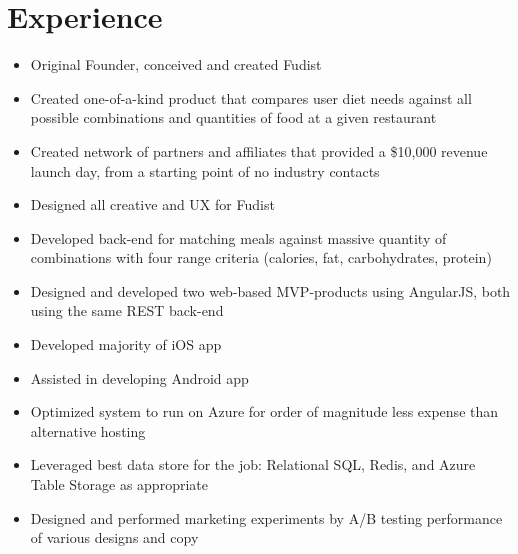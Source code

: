 \documentclass[12pt,letterpaper,sans]{moderncv}
\begin{document}
\section{Experience}
    \begin{itemize}[leftmargin=1.24in]
    	\item Original Founder, conceived and created Fudist		
        \item Created one-of-a-kind product that compares user diet needs against all possible combinations and quantities of food at a given restaurant
        \item Created network of partners and affiliates that provided a \$10,000 revenue launch day, from a starting point of no industry contacts
		\item Designed all creative and UX for Fudist                       
        \item Developed back-end for matching meals against massive quantity of combinations with four range criteria (calories, fat, carbohydrates, protein)
        \item Designed and developed two web-based MVP-products using AngularJS, both using the same REST back-end
        \item Developed majority of iOS app
        \item Assisted in developing Android app
        \item Optimized system to run on Azure for order of magnitude less expense than alternative hosting
        \item Leveraged best data store for the job: Relational SQL, Redis, and Azure Table Storage as appropriate
        \item Designed and performed marketing experiments by A/B testing performance of various designs and copy
    \end{itemize}
\newpage
{}
\end{document}
